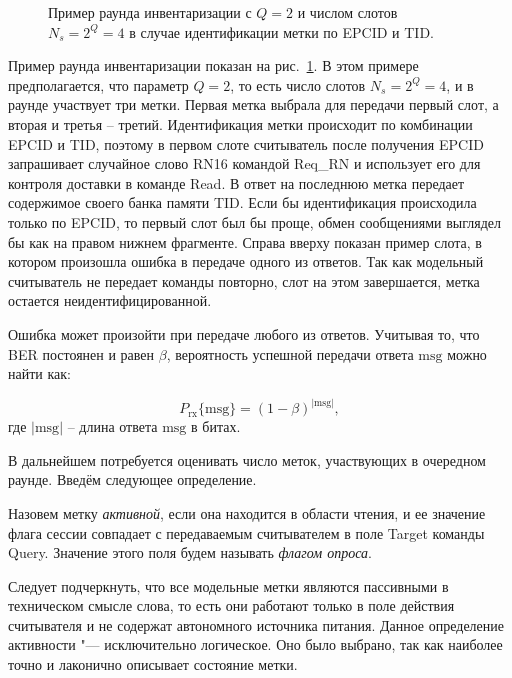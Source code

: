 \begin{figure}[htb]
  \caption[Пример раунда опроса при идентификации по EPCID и TID.]{Пример раунда инвентаризации с $Q=2$ и числом слотов $N_s=2^Q=4$ в случае идентификации метки по EPCID и TID. }
  \label{fig:ch3_inventory_round}
\end{figure}

Пример раунда инвентаризации показан на рис.~\ref{fig:ch3_inventory_round}. В этом примере предполагается, что параметр $Q = 2$, то есть число слотов $N_s = 2^Q = 4$, и в раунде участвует три метки. Первая метка выбрала для передачи первый слот, а вторая и третья -- третий. Идентификация метки происходит по комбинации EPCID и TID, поэтому в первом слоте считыватель после получения EPCID запрашивает случайное слово RN16 командой Req\_RN и использует его для контроля доставки в команде Read. В ответ на последнюю метка передает содержимое своего банка памяти TID. Если бы идентификация происходила только по EPCID, то первый слот был бы проще, обмен сообщениями выглядел бы как на правом нижнем фрагменте. Справа вверху показан пример слота, в котором произошла ошибка в передаче одного из ответов. Так как модельный считыватель не передает команды повторно, слот на этом завершается, метка остается неидентифицированной.

Ошибка может произойти при передаче любого из ответов. Учитывая то, что BER постоянен и равен $\beta$, вероятность успешной передачи ответа $\text{msg}$ можно найти как:

\begin{equation}\label{eq:ch3_response_err}
	P_\text{rx}\{\text{msg}\} = (1 - \beta)^{|\text{msg}|},
\end{equation}
где $|\text{msg}|$ -- длина ответа $\text{msg}$ в битах.

В дальнейшем потребуется оценивать число меток, участвующих в очередном раунде. Введём следующее определение.

\begin{defn}
	Назовем метку \textit{активной}, если она находится в области чтения, и ее значение флага сессии совпадает с передаваемым считывателем в поле Target команды Query. Значение этого поля будем называть \textit{флагом опроса}.
\end{defn}
\begin{rem}
	Следует подчеркнуть, что все модельные метки являются пассивными в техническом смысле слова, то есть они работают только в поле действия считывателя и не содержат автономного источника питания. Данное определение активности "--- исключительно логическое. Оно было выбрано, так как наиболее точно и лаконично описывает состояние метки.
\end{rem}

